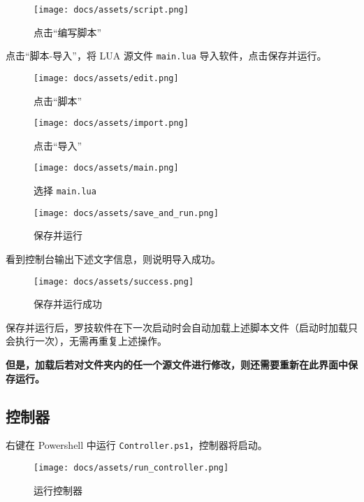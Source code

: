 \begin{figure}[H]
    \Centering
    \texttt{[image: docs/assets/script.png]}
    \caption{点击“编写脚本”}
\end{figure}

点击“脚本-导入”，将 LUA 源文件 \lstinline{main.lua} 导入软件，点击保存并运行。

\begin{figure}[H]
    \Centering
    \texttt{[image: docs/assets/edit.png]}
    \caption{点击“脚本”}
\end{figure}

\begin{figure}[H]
    \Centering
    \texttt{[image: docs/assets/import.png]}
    \caption{点击“导入”}
\end{figure}

\begin{figure}[H]
    \Centering
    \texttt{[image: docs/assets/main.png]}
    \caption{选择 \lstinline{main.lua}}
\end{figure}

\begin{figure}[H]
    \Centering
    \texttt{[image: docs/assets/save\_and\_run.png]}
    \caption{保存并运行}
\end{figure}

看到控制台输出下述文字信息，则说明导入成功。

\begin{figure}[H]
    \Centering
    \texttt{[image: docs/assets/success.png]}
    \caption{保存并运行成功}
\end{figure}

保存并运行后，罗技软件在下一次启动时会自动加载上述脚本文件（启动时加载只会执行一次），无需再重复上述操作。

\textbf{\color{red}但是，加载后若对文件夹内的任一个源文件进行修改，则还需要重新在此界面中保存运行。}

\subsection{控制器}

右键在 Powershell 中运行 \lstinline{Controller.ps1}，控制器将启动。

\begin{figure}[H]
    \Centering
    \texttt{[image: docs/assets/run\_controller.png]}
    \caption{运行控制器}
\end{figure}

